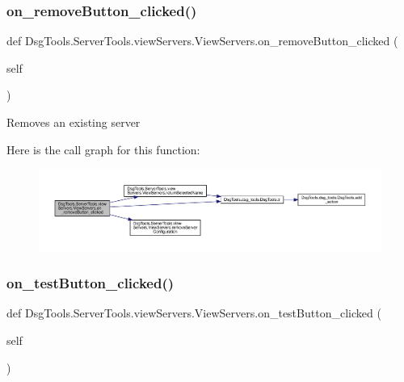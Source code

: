 \subsubsection{\texorpdfstring{on\+\_\+remove\+Button\+\_\+clicked()}{on\_removeButton\_clicked()}}
{\footnotesize\ttfamily def Dsg\+Tools.\+Server\+Tools.\+view\+Servers.\+View\+Servers.\+on\+\_\+remove\+Button\+\_\+clicked (\begin{DoxyParamCaption}\item[{}]{self }\end{DoxyParamCaption})}

\begin{DoxyVerb}Removes an existing server
\end{DoxyVerb}
 Here is the call graph for this function\+:
\nopagebreak
\begin{figure}[H]
\begin{center}
\leavevmode
\includegraphics[width=350pt]{class_dsg_tools_1_1_server_tools_1_1view_servers_1_1_view_servers_a36ff167362cfb77b33c3a334dba8f6d2_cgraph}
\end{center}
\end{figure}
\mbox{\label{class_dsg_tools_1_1_server_tools_1_1view_servers_1_1_view_servers_a778e3427c24e845df98c73689e392997}} 
\subsubsection{\texorpdfstring{on\+\_\+test\+Button\+\_\+clicked()}{on\_testButton\_clicked()}}
{\footnotesize\ttfamily def Dsg\+Tools.\+Server\+Tools.\+view\+Servers.\+View\+Servers.\+on\+\_\+test\+Button\+\_\+clicked (\begin{DoxyParamCaption}\item[{}]{self }\end{DoxyParamCaption})}

